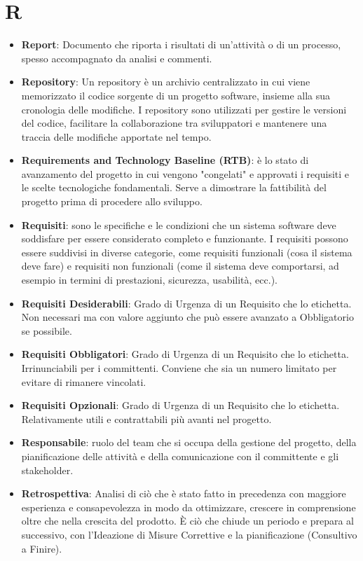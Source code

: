 \documentclass[a4paper,12pt]{article}
\begin{document}
\section{R}
\begin{itemize}
    \item \textbf{Report}: Documento che riporta i risultati di un'attività o di un processo, spesso accompagnato da analisi e commenti.
    \item \textbf{Repository}: Un repository è un archivio centralizzato in cui viene memorizzato il codice sorgente di un progetto software, insieme alla sua cronologia delle modifiche. I repository sono utilizzati per gestire le versioni del codice, facilitare la collaborazione tra sviluppatori e mantenere una traccia delle modifiche apportate nel tempo.
    \item \textbf{Requirements and Technology Baseline (RTB)}: è lo stato di avanzamento del progetto in cui vengono "congelati" e approvati i requisiti e le scelte tecnologiche fondamentali. Serve a dimostrare la fattibilità del progetto prima di procedere allo sviluppo. 
    \item \textbf{Requisiti}: sono le specifiche e le condizioni che un sistema software deve soddisfare per essere considerato completo e funzionante. I requisiti possono essere suddivisi in diverse categorie, come requisiti funzionali (cosa il sistema deve fare) e requisiti non funzionali (come il sistema deve comportarsi, ad esempio in termini di prestazioni, sicurezza, usabilità, ecc.).
    \item \textbf{Requisiti Desiderabili}: Grado di Urgenza di un Requisito che lo etichetta. Non necessari ma con valore aggiunto che può essere avanzato a Obbligatorio se possibile.
    \item \textbf{Requisiti Obbligatori}: Grado di Urgenza di un Requisito che lo etichetta. Irrinunciabili per i committenti. Conviene che sia un numero limitato per evitare di rimanere vincolati.
    \item \textbf{Requisiti Opzionali}: Grado di Urgenza di un Requisito che lo etichetta. Relativamente utili e contrattabili più avanti nel progetto.
    \item \textbf{Responsabile}: ruolo del team che si occupa della gestione del progetto, della pianificazione delle attività e della comunicazione con il committente e gli stakeholder.
    \item \textbf{Retrospettiva}: Analisi di ciò che è stato fatto in precedenza con maggiore esperienza e consapevolezza in modo da ottimizzare, crescere in comprensione oltre che nella crescita del prodotto. È ciò che chiude un periodo e prepara al successivo, con l'Ideazione di Misure Correttive e la pianificazione (Consultivo a Finire).

\end{itemize}
\end{document}
